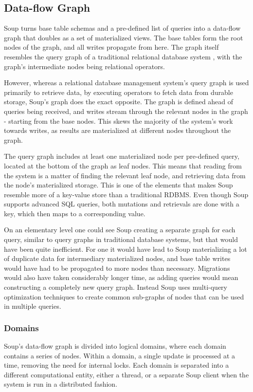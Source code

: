 \documentclass[b5paper]{report}
\begin{document}
\subsection{Data-flow Graph}
Soup turns base table schemas and a pre-defined list of queries into a data-flow
graph that doubles as a set of materialized views. The base tables form the
root nodes of the graph, and all writes propagate from here. The graph itself
resembles the query graph of a traditional relational database system
\cite{codd}, with the graph's intermediate nodes being relational operators.

However, whereas a relational database management system's query graph is used
primarily to retrieve data, by executing operators to fetch data from durable
storage, Soup's graph does the exact opposite. The graph is defined ahead of
queries being received, and writes stream through the relevant nodes in the
graph - starting from the base nodes. This skews the majority of the system's
work towards writes, as results are materialized at different nodes throughout
the graph.

The query graph includes at least one materialized node per pre-defined query,
located at the bottom of the graph as leaf nodes. This means that reading from
the system is a matter of finding the relevant leaf node, and retrieving data
from the node's materialized storage. This is one of the elements that makes Soup
resemble more of a key-value store than a traditional RDBMS. Even though Soup
supports advanced SQL queries, both mutations and retrievals are done with a
key, which then maps to a corresponding value.

On an elementary level one could see Soup creating a separate graph for each
query, similar to query graphs in traditional database systems, but that would
have been quite inefficient. For one it would have lead to Soup materializing a
lot of duplicate data for intermediary materialized nodes, and base table writes
would have had to be propagated to more nodes than necessary. Migrations would
also have taken considerably longer time, as adding queries would mean
constructing a completely new query graph. Instead Soup uses multi-query
optimization techniques to create common sub-graphs of nodes that can be used in
multiple queries.

\subsubsection{Domains}
Soup's data-flow graph is divided into logical domains, where each domain
contains a series of nodes. Within a domain, a single update is processed at a
time, removing the need for internal locks. Each domain is separated into a
different computational entity, either a thread, or a separate Soup client when
the system is run in a distributed fashion.
\end{document}
